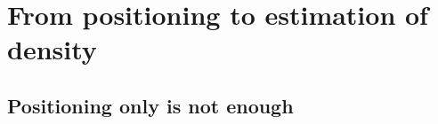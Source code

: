 \documentclass[10pt,a4paper]{article}
\begin{document}

\section{From positioning to estimation of density}
\label{sec:density}


\subsection{Positioning only is not enough}
\end{document}
